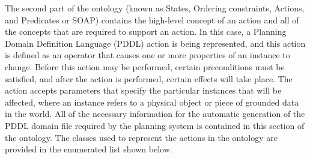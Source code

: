 The second part of the ontology (known as States, Ordering constraints, Actions, and Predicates or SOAP) contains the high-level concept of an action and all of the concepts 
that are required to support an action. In this case, a Planning Domain Definition Language (PDDL) \cite{PDDL} action is being represented, and this action is defined
 as an operator that causes one or more properties of an 
instance to change. Before this action may be
performed, certain preconditions must be satisfied, and after the action is performed, certain effects will take place. The action accepts parameters that specify the particular
instances that will be affected, where an instance refers to a physical object or piece of grounded data in the world. All of the necessary information for the automatic generation of the PDDL domain file required by the planning system is contained in this section of the ontology. The classes used to represent the actions in the ontology are provided in the
enumerated list shown below. 
